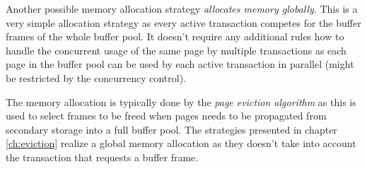     Another possible memory allocation strategy \emph{allocates memory globally}. This is a very simple allocation strategy as every active transaction competes for the buffer frames of the whole buffer pool. It doesn't require any additional rules how to handle the concurrent usage of the same page by multiple transactions as each page in the buffer pool can be used by each active transaction in parallel (might be restricted by the concurrency control).

    The memory allocation is typically done by the \emph{page eviction algorithm} as this is used to select frames to be freed when pages needs to be propagated from secondary storage into a full buffer pool. The strategies presented in chapter \ref{ch:eviction} realize a global memory allocation as they doesn't take into account the transaction that requests a buffer frame.


